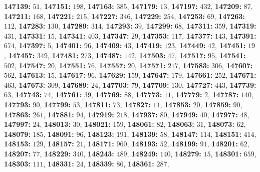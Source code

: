 \textsf{\bfseries 147139:} $51$, \textsf{\bfseries 147151:} $198$, \textsf{\bfseries 147163:} $385$, \textsf{\bfseries 147179:} $13$, \textsf{\bfseries 147197:} $432$, \textsf{\bfseries 147209:} $87$, \textsf{\bfseries 147211:} $168$, \textsf{\bfseries 147221:} $215$, \textsf{\bfseries 147227:} $346$, \textsf{\bfseries 147229:} $254$, \textsf{\bfseries 147253:} $69$, \textsf{\bfseries 147263:} $112$, \textsf{\bfseries 147283:} $130$, \textsf{\bfseries 147289:} $314$, \textsf{\bfseries 147293:} $39$, \textsf{\bfseries 147299:} $68$, \textsf{\bfseries 147311:} $359$, \textsf{\bfseries 147319:} $431$, \textsf{\bfseries 147331:} $15$, \textsf{\bfseries 147341:} $403$, \textsf{\bfseries 147347:} $29$, \textsf{\bfseries 147353:} $117$, \textsf{\bfseries 147377:} $143$, \textsf{\bfseries 147391:} $674$, \textsf{\bfseries 147397:} $5$, \textsf{\bfseries 147401:} $96$, \textsf{\bfseries 147409:} $43$, \textsf{\bfseries 147419:} $123$, \textsf{\bfseries 147449:} $42$, \textsf{\bfseries 147451:} $19$, \textsf{\bfseries 147457:} $349$, \textsf{\bfseries 147481:} $273$, \textsf{\bfseries 147487:} $142$, \textsf{\bfseries 147503:} $47$, \textsf{\bfseries 147517:} $95$, \textsf{\bfseries 147541:} $502$, \textsf{\bfseries 147547:} $20$, \textsf{\bfseries 147551:} $76$, \textsf{\bfseries 147557:} $20$, \textsf{\bfseries 147571:} $217$, \textsf{\bfseries 147583:} $306$, \textsf{\bfseries 147607:} $562$, \textsf{\bfseries 147613:} $15$, \textsf{\bfseries 147617:} $96$, \textsf{\bfseries 147629:} $159$, \textsf{\bfseries 147647:} $179$, \textsf{\bfseries 147661:} $252$, \textsf{\bfseries 147671:} $463$, \textsf{\bfseries 147673:} $309$, \textsf{\bfseries 147689:} $24$, \textsf{\bfseries 147703:} $79$, \textsf{\bfseries 147709:} $130$, \textsf{\bfseries 147727:} $443$, \textsf{\bfseries 147739:} $63$, \textsf{\bfseries 147743:} $74$, \textsf{\bfseries 147761:} $39$, \textsf{\bfseries 147769:} $88$, \textsf{\bfseries 147773:} $11$, \textsf{\bfseries 147779:} $2$, \textsf{\bfseries 147787:} $140$, \textsf{\bfseries 147793:} $90$, \textsf{\bfseries 147799:} $53$, \textsf{\bfseries 147811:} $73$, \textsf{\bfseries 147827:} $11$, \textsf{\bfseries 147853:} $20$, \textsf{\bfseries 147859:} $90$, \textsf{\bfseries 147863:} $261$, \textsf{\bfseries 147881:} $94$, \textsf{\bfseries 147919:} $218$, \textsf{\bfseries 147937:} $80$, \textsf{\bfseries 147949:} $40$, \textsf{\bfseries 147977:} $48$, \textsf{\bfseries 147997:} $24$, \textsf{\bfseries 148013:} $30$, \textsf{\bfseries 148021:} $159$, \textsf{\bfseries 148061:} $82$, \textsf{\bfseries 148063:} $31$, \textsf{\bfseries 148073:} $62$, \textsf{\bfseries 148079:} $185$, \textsf{\bfseries 148091:} $96$, \textsf{\bfseries 148123:} $191$, \textsf{\bfseries 148139:} $58$, \textsf{\bfseries 148147:} $114$, \textsf{\bfseries 148151:} $414$, \textsf{\bfseries 148153:} $129$, \textsf{\bfseries 148157:} $21$, \textsf{\bfseries 148171:} $960$, \textsf{\bfseries 148193:} $52$, \textsf{\bfseries 148199:} $91$, \textsf{\bfseries 148201:} $62$, \textsf{\bfseries 148207:} $77$, \textsf{\bfseries 148229:} $340$, \textsf{\bfseries 148243:} $489$, \textsf{\bfseries 148249:} $140$, \textsf{\bfseries 148279:} $15$, \textsf{\bfseries 148301:} $659$, \textsf{\bfseries 148303:} $111$, \textsf{\bfseries 148331:} $24$, \textsf{\bfseries 148339:} $86$, \textsf{\bfseries 148361:} $287$, 
